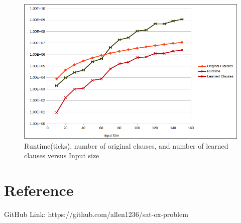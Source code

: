 \documentclass{article}
\begin{document}
    \begin{figure}[h]
        \begin{minipage}{0.99\textwidth}
        \centering
        \includegraphics[width=\textwidth]{img/graph.png}
        \caption{Runtime(ticks), number of original clauses, and number of learned clauses versus Input size}
        \label{fig:}
        \end{minipage}
    \end{figure}

    \section{Reference}

    GitHub Link: https://github.com/allen1236/sat-ox-problem 
        
\end{document}

